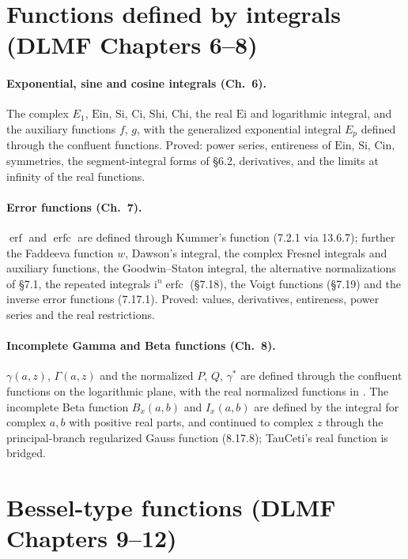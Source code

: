\documentclass[11pt,a4paper]{article}
\begin{document}
\section{Functions defined by integrals (DLMF Chapters 6--8)}

\paragraph{Exponential, sine and cosine integrals (Ch.~6).} The complex $E_1$, $\mathrm{Ein}$,
$\mathrm{Si}$, $\mathrm{Ci}$, $\mathrm{Shi}$, $\mathrm{Chi}$, the real $\mathrm{Ei}$ and
logarithmic integral, and the auxiliary functions $f$, $g$, with the generalized exponential
integral $E_p$ defined through the confluent functions. Proved: power series, entireness of
$\mathrm{Ein}$, $\mathrm{Si}$, $\mathrm{Cin}$, symmetries, the segment-integral forms of \S6.2,
derivatives, and the limits at infinity of the real functions.

\paragraph{Error functions (Ch.~7).} $\operatorname{erf}$ and $\operatorname{erfc}$ are defined
through Kummer's function (7.2.1 via 13.6.7); further the Faddeeva function $w$, Dawson's
integral, the complex Fresnel integrals and auxiliary functions, the Goodwin--Staton integral,
the alternative normalizations of \S7.1, the repeated integrals $\mathrm{i}^n\operatorname{erfc}$
(\S7.18), the Voigt functions (\S7.19) and the inverse error functions (7.17.1). Proved:
values, derivatives, entireness, power series and the real restrictions.

\paragraph{Incomplete Gamma and Beta functions (Ch.~8).} $\gamma(a,z)$, $\Gamma(a,z)$ and the
normalized $P$, $Q$, $\gamma^*$ are defined through the confluent functions on the logarithmic
plane, with the real normalized functions in . The incomplete
Beta function $B_x(a,b)$ and $I_x(a,b)$ are defined by the integral for complex $a,b$ with
positive real parts, and continued to complex $z$ through the principal-branch regularized
Gauss function (8.17.8); TauCeti's real function is bridged.

\section{Bessel-type functions (DLMF Chapters 9--12)}
\end{document}
